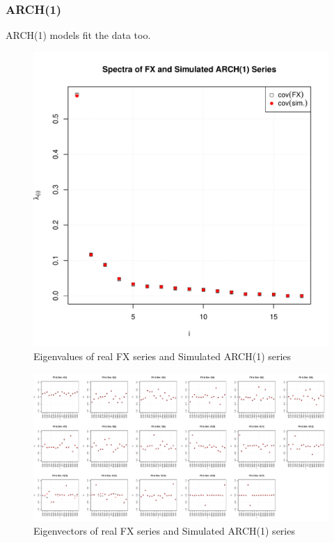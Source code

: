 \documentclass{beamer}
\begin{document}
\begin{frame}
  \frametitle{ARCH(1)}  
  ARCH(1) models fit the data too.
  \begin{figure}[htb!]
    \centering
    \includegraphics[scale=0.35]{FX_ARCH_eigenvalues.pdf}
    \caption{\scriptsize Eigenvalues of real FX series and Simulated ARCH(1) series}
  \end{figure}
\end{frame}

\begin{frame}
  \begin{figure}[htb!]
    \centering
    \includegraphics[scale=0.2]{FX_ARCH_eigenvectors.pdf}
    \caption{\scriptsize Eigenvectors of real FX series and Simulated ARCH(1) series}
  \end{figure}
\end{frame}
\end{document}
